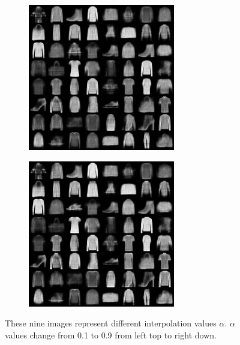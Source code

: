 \begin{figure}[htbp]
    \begin{subfigure}
        \centering
        \includegraphics[width=0.32\linewidth]{../images/vae-0.80-merge.png}
        \label{fig:vae_0.8}
    \end{subfigure}
    \begin{subfigure}
        \centering
        \includegraphics[width=0.32\linewidth]{../images/vae-0.90-merge.png}
        \label{fig:vae_0.9}
    \end{subfigure}
    
    \caption{These nine images represent different interpolation values $\alpha$. $\alpha$ values change from 0.1 to 0.9 from left top to right down.}
    \label{fig:vae_samples}
\end{figure}
